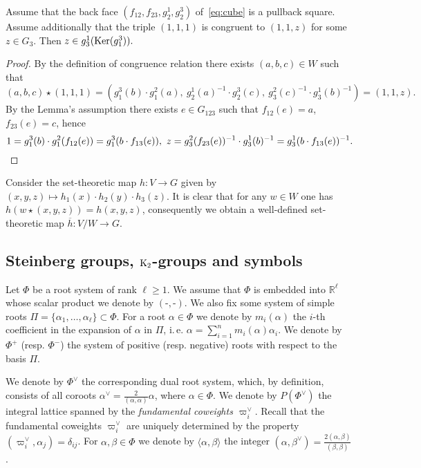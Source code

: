 \begin{lemma}\label{one-one-z} Assume that the back face $(f_{12}, f_{23}, g_2^1, g_2^3)$ of~\eqref{eq:cube} is a pullback square.
Assume additionally that the triple $(1, 1, 1)$ is congruent to $(1, 1, z)$ for some $z\in G_3$.
Then $z \in g_3^1(\operatorname{Ker}(g_1^3)).$ \end{lemma}
\begin{proof} By the definition of congruence relation there exists $(a, b, c)\in W$ such that
\[ (a, b, c) \star (1, 1, 1) = ( g_1^3(b) \cdot g_1^2(a),\ g_2^1(a)^{-1} \cdot g_2^3(c),\ g_3^2(c)^{-1} \cdot g_3^1(b)^{-1}) = (1,1,z). \]
By the Lemma's assumption there exists $e \in G_{123}$ such that $f_{12}(e) = a$, $f_{23}(e) = c$, hence
\[ 1 = g_1^3(b) \cdot g_1^2(f_{12}(e)) = g_1^3(b \cdot f_{13}(e)),\ z = g_3^2(f_{23}(e))^{-1} \cdot g_3^1(b)^{-1} = g_3^1(b \cdot f_{13}(e))^{-1}. \qedhere\] \end{proof}

Consider the set-theoretic map $h \colon V \to G$ given by $(x, y, z) \mapsto h_1(x) \cdot h_2(y) \cdot h_3(z)$.
It is clear that for any $w \in W$ one has $h(w \star (x, y, z)) = h(x, y, z)$, consequently we obtain a well-defined set-theoretic map $\overline{h} \colon V/W \to G$.

\subsection{Steinberg groups, $\operatorname{K}_2$-groups and symbols}\label{subsec:steinberg-preliminaries}
Let $\Phi$ be a root system of rank $\ell \geq 1$.
We assume that $\Phi$ is embedded into $\mathbb{R}^\ell$ whose scalar product we denote by $(\text{-}, \text{-})$.
We also fix some system of simple roots $\Pi = \{\alpha_1, \ldots, \alpha_\ell\} \subset \Phi$.
For a root $\alpha\in\Phi$ we denote by $m_i(\alpha)$ the $i$-th coefficient in the expansion of $\alpha$ in $\Pi$,
i.\,e. $\alpha = \sum_{i=1}^n m_i(\alpha) \alpha_i$.
We denote by $\Phi^+$ (resp. $\Phi^-$) the system of positive (resp. negative) roots with respect to the basis $\Pi$.

We denote by $\Phi^\vee$ the corresponding dual root system, which, by definition, consists of all coroots $\alpha^\vee = \frac{2}{(\alpha, \alpha)} \alpha$, where $\alpha \in \Phi$.
We denote by $P(\Phi^\vee)$ the integral lattice spanned by the \emph{fundamental coweights $\varpi_i^\vee$}.
Recall that the fundamental coweights $\varpi_i^\vee$ are uniquely determined by the property $(\varpi_i^\vee, \alpha_j) = \delta_{ij}$.
For $\alpha,\beta \in \Phi$ we denote by $\langle \alpha, \beta \rangle$ the integer $(\alpha, \beta^\vee) = \frac{2(\alpha, \beta)}{(\beta, \beta)}$.

